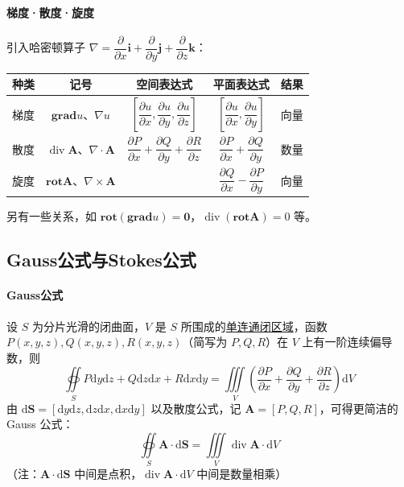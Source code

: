 \documentclass[UTF8]{ctexart}
\renewcommand\arraystretch{1.7}
\renewcommand\d{\mathrm{d}}
\newcommand\A{\boldsymbol{A}}
\newcommand\ii{\boldsymbol{i}}
\newcommand\jj{\boldsymbol{j}}
\newcommand\kk{\boldsymbol{k}}
\newcommand\grad{\mathbf{grad}}
\renewcommand\div{\operatorname{div}} %
\newcommand\rot{\mathbf{rot}}
\begin{document}
\paragraph{梯度·散度·旋度} 
引入哈密顿算子 $\nabla = \dfrac{\partial}{\partial x}\ii + \dfrac{\partial}{\partial y}\jj + \dfrac{\partial}{\partial z}\kk$：
\begin{mybox}
\begin{center}
\begin{tabular}{|c|c|c|c|c|}
    \hline
    种类 & 记号 & 空间表达式 & 平面表达式 & 结果 \\
    \hline
    梯度 & $\grad u$、$\nabla u$ & $\left[\dfrac{\partial u}{\partial x},\dfrac{\partial u}{\partial y}, \dfrac{\partial u}{\partial z}\right]$ & $\left[\dfrac{\partial u}{\partial x}, \dfrac{\partial u}{\partial y}\right]$ & 向量\\
    \hline
    散度 & $\div \A$、$\nabla\cdot\A$ & $\dfrac{\partial P}{\partial x} + \dfrac{\partial Q}{\partial y} + \dfrac{\partial R}{\partial z}$ & $\dfrac{\partial P}{\partial x}+\dfrac{\partial Q}{\partial y}$ &数量 \\
    \hline
    旋度 & $\rot \A$、$\nabla\times\A$ &{\renewcommand\arraystretch{1.2} $\begin{vmatrix}
          \ii & \jj & \kk \\
          \dfrac{\partial }{\partial x} & \dfrac{\partial }{\partial y} & \dfrac{\partial }{\partial z} \\
          P & Q & R \\
                                       \end{vmatrix}$} 
          & $\dfrac{\partial Q}{\partial x}-\dfrac{\partial P}{\partial y}$ & 向量 \\[8pt]
    \hline
\end{tabular}
\end{center}
\end{mybox}
另有一些关系，如 $\rot(\grad u)=\mathbf{0}$，$\div(\rot \A)=0$ 等。

\subsection{Gauss公式与Stokes公式}
\paragraph{Gauss公式} 设 $S$ 为分片光滑的闭曲面，$V$ 是 $S$ 所围成的\underline{单连通闭区域}，函数 $P(x,y,z),Q(x,y,z),R(x,y,z)$（简写为 $P,Q,R$）在 $V$ 上有一阶连续偏导数，则
\begin{equation*}
    \oiint\limits_{S} P\d y\d z + Q\d z\d x + R\d x\d y = \iiint\limits_{V} \left(\dfrac{\partial P}{\partial x} + \dfrac{\partial Q}{\partial y} + \dfrac{\partial R}{\partial z}\right)\d V
\end{equation*}
由 $\d\boldsymbol{S} = [\d y\d z, \d z\d x, \d x\d y]$ 以及散度公式，记 $\A=[P,Q,R]$，可得更简洁的 Gauss 公式：
\begin{equation*}
    \oiint\limits_{S} \A\cdot \d\boldsymbol{S} = \iiint\limits_{V} \div \A\cdot  \d V
\end{equation*}
（注：$\A\cdot \d\boldsymbol{S}$ 中间是点积，$\div \A\cdot  \d V$ 中间是数量相乘）
\end{document}
